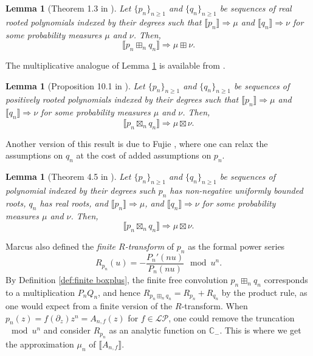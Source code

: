 \documentclass[reqno]{amsart}
\newcommand{\1}{\mathbf{1}}
\newcommand{\C}{\mathbb{C}}
\newcommand{\LP}{\mathcal{LP}}
\theoremstyle{plain}
\newtheorem{lemma}[theorem]{Lemma}
\theoremstyle{definition}
\theoremstyle{remark}
\numberwithin{equation}{section}
\begin{document}
\begin{lemma}[Theorem 1.3 in \cite{Fujie2026}]\label{lem: convolution convergence}
	Let $\{p_{n}\}_{n\geq 1}$ and $\{q_n\}_{n\geq 1}$ be sequences of real rooted polynomials indexed by their degrees such that $\llbracket p_n\rrbracket\Rightarrow\mu$ and $\llbracket q_n\rrbracket\Rightarrow \nu$ for some probability measures $\mu$ and $\nu$. Then, \begin{equation}
		\llbracket p_n\boxplus_{n} q_{n}\rrbracket\Rightarrow\mu\boxplus\nu.
	\end{equation}
\end{lemma}   The multiplicative analogue of Lemma \ref{lem: convolution convergence} is available from \cite{Arizmendi-Fujie-Perales-Ueda2024}.  \begin{lemma}[Proposition 10.1 in \cite{Arizmendi-Fujie-Perales-Ueda2024}]\label{lem: mult convolution convergence}
Let $\{p_{n}\}_{n\geq 1}$ and $\{q_n\}_{n\geq 1}$ be sequences of positively rooted polynomials indexed by their degrees such that $\llbracket p_n\rrbracket\Rightarrow\mu$ and $\llbracket q_n\rrbracket\Rightarrow \nu$ for some probability measures $\mu$ and $\nu$. Then, \begin{equation}
	\llbracket p_n\boxtimes_{n} q_{n}\rrbracket\Rightarrow\mu\boxtimes\nu.
\end{equation}
\end{lemma} 
Another version of this result is due to Fujie \cite{Fujie2026}, where one can relax the assumptions on $q_n$ at the cost of added assumptions on $p_n$.  \begin{lemma}[Theorem 4.5 in \cite{Fujie2026}]\label{lem: mult convolution convergence Fujie}
Let $\{p_{n}\}_{n\geq 1}$ and $\{q_n\}_{n\geq 1}$ be sequences of polynomial indexed by their degrees such $p_n$ has non-negative uniformly bounded roots, $q_n$ has real roots, and $\llbracket p_n\rrbracket\Rightarrow\mu$, and $\llbracket q_n\rrbracket\Rightarrow \nu$ for some probability measures $\mu$ and $\nu$. Then, \begin{equation}
	\llbracket p_n\boxtimes_{n} q_{n}\rrbracket\Rightarrow\mu\boxtimes\nu.
\end{equation}
\end{lemma} Marcus \cite{Marcus2021} also defined the \emph{finite $R$-transform} of $p_n$ as the formal power series \begin{equation}
R_{p_n}(u)=-\frac{P_n'(nu)}{P_{n}(nu)}\mod u^{n}.
\end{equation}
By Definition \ref{def:finite boxplus}, the finite free convolution $	p_n\boxplus_{n}q_{n}$ corresponds to a multiplication $P_nQ_n$, and hence $R_{	p_n\boxplus_{n}q_{n }}=R_{p_n}+R_{q_n}$ by the product rule, as one would expect from a finite version of the $R$-transform. When $p_n(z)=f(\partial_z)z^{n}=A_{n,f}(z)$ for $f\in\LP$, one could remove the truncation $\mod u^{n}$ and consider $R_{p_n}$ as an analytic function on $\C_-$. This is where we get the approximation $\mu_{n}$ of $\llbracket A_{n,f}\rrbracket$. 
\end{document}
